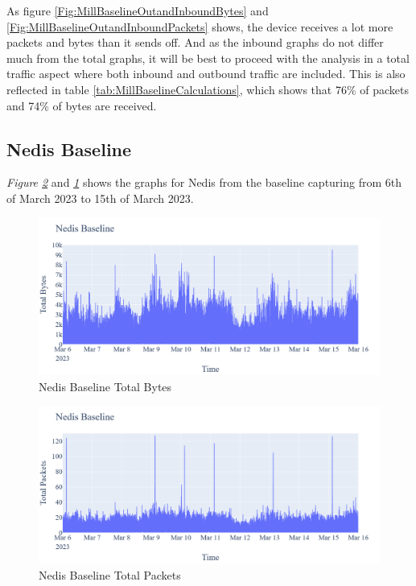 As figure \ref{Fig:MillBaselineOutandInboundBytes} and \ref{Fig:MillBaselineOutandInboundPackets} shows, the device receives a lot more packets and bytes than it sends off. And as the inbound graphs do not differ much from the total graphs, it will be best to proceed with the analysis in a total traffic aspect where both inbound and outbound traffic are included. This is also reflected in table \ref{tab:MillBaselineCalculations}, which shows that 76\% of packets and 74\% of bytes are received.

\subsection{Nedis Baseline}
\textit{Figure \ref{fig:NedisBaselineTotalPackets}} and \textit{\ref{fig:NedisBaselineTotalBytes}} shows the graphs for Nedis from the baseline capturing from 6th of March 2023 to 15th of March 2023. 
\begin{figure} [H]
    \centering
    \includegraphics[scale=0.3]{figures/Nedis_Baseline_TotalBytes.png}
    \caption{Nedis Baseline Total Bytes}
    \label{fig:NedisBaselineTotalBytes}
\end{figure}

\begin{figure} [H]         
    \includegraphics[scale=0.3]{figures/Nedis_Baseline_TotalPackets.png}
    \caption{Nedis Baseline Total Packets}
    \label{fig:NedisBaselineTotalPackets}
 \end{figure}

